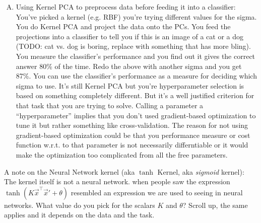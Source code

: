 {\begin{enumerate}[(A)]
\begin{enumerate}
\item Measure and compare reconstruction error between the two sigmas. It's exactly what we're looking for when doing dimensionality reduction. More intuitive than looking at a scree plot but it involves reconstructing and that involves approximations (c.f. lecture slide 1.4 \#23) so there's a drawback.
Something to keep in mind when using reconstruction error is that for the same sigma you get some value for your reconstruction error when measure it for data that you used in training (i.e. solving the eigenvalue problem) vs. the error value you get when reconstructing test data. This is where cross validation comes in. We're going to talk about cross-validation later in the course when we talk about density estimation. Basically, you want to know how well your model does when you feed it data that it's never seen before. If it does well on training data but badly on unseen data, then you can't really deploy this model. So before deploying it you need to measure this performance (e.g. reconstruction error) on unseen data. This is called cross validation and you can use this to compare how well one sigma does vs another. How well does one sigma do on unseen data vs. the other sigma? The sigma that has better cross validation performance is the one you go with.
\end{enumerate}

\item Using Kernel PCA to preprocess data before feeding it into a classifier:
You've picked a kernel (e.g. RBF) you're trying different values for the sigma. You do Kernel PCA and project the data onto the PCs. You feed the projections into a classifier to tell you if this is an image of a cat or a dog (TODO: cat vs. dog is boring, replace with something that has more bling). You measure the classifier's performance and you find out it gives the correct answer 80\% of the time. Redo the above with another sigma and you get 87\%. You can use the classifier's performance as a measure for deciding which sigma to use. It's still Kernel PCA but you're hyperparameter selection is based on something completely different. But it's a well justified criterion for that task that you are trying to solve. Calling a parameter a ``hyperparameter'' implies that you don't used gradient-based optimization to tune it but rather something like cross-validation. The reason for not using gradient-based optimization could be that you performance measure or cost function w.r.t. to that parameter is not necessarily differntiable or it would make the optimization too complicated from all the free parameters.

\end{enumerate}

A note on the Neural Network kernel (aka $\tanh$ Kernel, aka \textit{sigmoid} kernel):
The kernel itself is not a neural network. when people saw the expression $\tanh(K \vec x^\top \vec x' + \theta)$ resembled an expression we are used to seeing in neural networks. What value do you pick for the scalars $K$ and $\theta$? Scroll up, the same applies and it depends on the data and the task.

}

